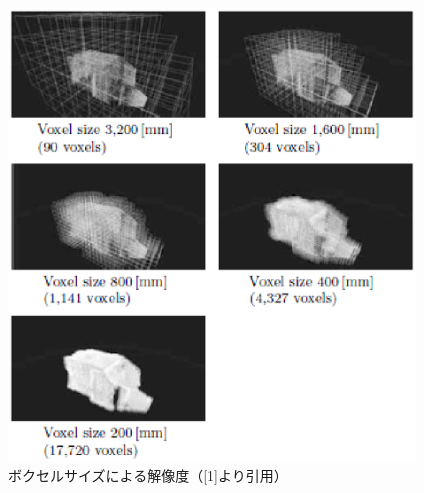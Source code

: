 \begin{figure}[htbp]
  \vspace{5mm}
  \begin{center}
   \includegraphics[height=120mm]{figure/ボクセルサイズによる解像度.eps}
   \vspace{-5mm}
   \caption{ボクセルサイズによる解像度（[1]より引用）}
   \label{ボクセルサイズによる解像度}
  \end{center}
\end{figure}
%
\newpage
%

